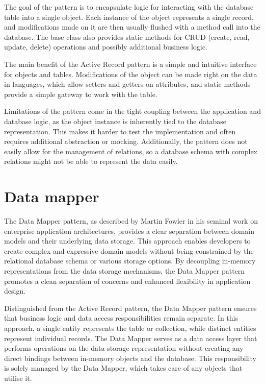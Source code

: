 The goal of the pattern is to encapsulate logic for interacting with the
database table into a single object. Each instance of the object represents a
single record, and modifications made on it are then usually flushed with a
method call into the database. The base class also provides static methods for
CRUD (create, read, update, delete) operations and possibly additional business
logic.  



The main benefit of the Active Record pattern is a simple and intuitive
interface for objects and tables. Modifications of the object can be made right
on the data in languages, which allow setters and getters on attributes, and
static methods provide a simple gateway to work with the table. 

Limitations of the pattern come in the tight coupling between the application
and database logic, as the object instance is inherently tied to the database
representation. This makes it harder to test the implementation and often
requires additional abstraction or mocking. Additionally, the pattern does not
easily allow for the management of relations, so a database schema with complex
relations might not be able to represent the data easily. 


\section{Data mapper}
The Data Mapper pattern, as described by Martin Fowler in his seminal work on
enterprise application architectures, provides a clear separation between domain
models and their underlying data storage. This approach enables developers to
create complex and expressive domain models without being constrained by the
relational database schema or various storage options. By decoupling in-memory
representations from the data storage mechanisms, the Data Mapper pattern
promotes a clean separation of concerns and enhanced flexibility in application
design.

Distinguished from the Active Record pattern, the Data Mapper pattern ensures
that business logic and data access responsibilities remain separate. In this
approach, a single entity represents the table or collection, while distinct
entities represent individual records. The Data Mapper serves as a data access
layer that performs operations on the data storage representation without
creating any direct bindings between in-memory objects and the database. This
responsibility is solely managed by the Data Mapper, which takes care of any
objects that utilise it.

